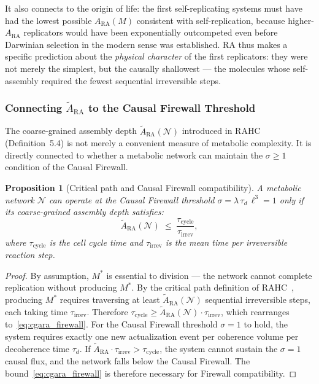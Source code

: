 \documentclass[11pt,a4paper]{article}
\theoremstyle{plain}
\newtheorem{proposition}[theorem]{Proposition}
\theoremstyle{definition}
\theoremstyle{remark}
\newcommand{\ARA}{A_{\mathrm{RA}}}
\begin{document}
It also connects to the origin of life: the first self-replicating systems must
have had the lowest possible $\ARA(M)$ consistent with self-replication, because
higher-$\ARA$ replicators would have been exponentially outcompeted even before
Darwinian selection in the modern sense was established. RA thus makes a specific
prediction about the \emph{physical character} of the first replicators: they were
not merely the simplest, but the causally shallowest --- the molecules whose
self-assembly required the fewest sequential irreversible steps.

\subsubsection{Connecting $\tilde{A}_{\mathrm{RA}}$ to the Causal Firewall Threshold}
\label{sec:cgara_firewall}

The coarse-grained assembly depth $\tilde{A}_{\mathrm{RA}}(\mathcal{N})$
introduced in RAHC~\citep{Sandeman2026RAHC} (Definition~5.4) is not merely a
convenient measure of metabolic complexity. It is directly connected to whether a
metabolic network can maintain the $\sigma \geq 1$ condition of the Causal Firewall.

\begin{proposition}[Critical path and Causal Firewall compatibility]
\label{prop:cgara_firewall}
A metabolic network $\mathcal{N}$ can operate at the Causal Firewall threshold
$\sigma = \lambda\,\tau_d\,\ell^3 = 1$ only if its coarse-grained assembly depth
satisfies:
\begin{equation}
  \tilde{A}_{\mathrm{RA}}(\mathcal{N}) \;\leq\;
  \frac{\tau_{\mathrm{cycle}}}{\tau_{\mathrm{irrev}}},
  \label{eq:cgara_firewall}
\end{equation}
where $\tau_{\mathrm{cycle}}$ is the cell cycle time and
$\tau_{\mathrm{irrev}}$ is the mean time per irreversible reaction step.
\end{proposition}

\begin{proof}
By assumption, $M^*$ is essential to division --- the network cannot complete
replication without producing $M^*$. By the critical path definition of
RAHC~\citep{Sandeman2026RAHC}, producing $M^*$ requires traversing at least
$\tilde{A}_{\mathrm{RA}}(\mathcal{N})$ sequential irreversible steps, each taking
time $\tau_{\mathrm{irrev}}$. Therefore
$\tau_{\mathrm{cycle}} \geq \tilde{A}_{\mathrm{RA}}(\mathcal{N}) \cdot \tau_{\mathrm{irrev}}$,
which rearranges to~\eqref{eq:cgara_firewall}.
For the Causal Firewall threshold $\sigma = 1$ to hold, the system requires
exactly one new actualization event per coherence volume per decoherence time
$\tau_d$. If $\tilde{A}_{\mathrm{RA}} \cdot \tau_{\mathrm{irrev}} > \tau_{\mathrm{cycle}}$,
the system cannot sustain the $\sigma = 1$ causal flux, and the network
falls below the Causal Firewall. The bound~\eqref{eq:cgara_firewall} is
therefore necessary for Firewall compatibility.
\end{proof}
\end{document}
